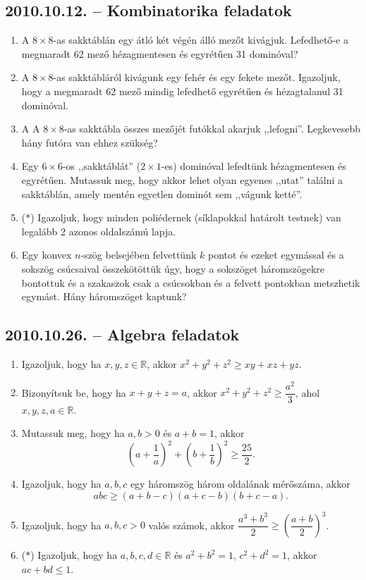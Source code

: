 \documentclass{article}
\begin{document}
\subsection*{2010.10.12. -- Kombinatorika feladatok}
\begin{enumerate}
\item A $8\times 8$-as sakktáblán egy átló két végén álló mezőt kivágjuk. Lefedhető-e a megmaradt 62 mező hézagmentesen és egyrétűen 31 dominóval?
\item A $8\times 8$-as sakktábláról kivágunk egy fehér és egy fekete mezőt. Igazoljuk, hogy a megmaradt 62 mező mindig lefedhető egyrétűen és hézagtalanul 31 dominóval.
\item A A $8\times 8$-as sakktábla összes mezőjét futókkal akarjuk ,,lefogni''.
Legkevesebb hány futóra van ehhez szükség?
\item Egy $6\times 6$-os ,,sakktáblát'' ($2\times 1$-es) dominóval lefedtünk hézagmentesen és egyrétűen. Mutassuk meg, hogy akkor lehet olyan egyenes ,,utat''
találni a sakktáblán, amely mentén egyetlen dominót sem ,,vágunk ketté''.
\item ($*$) Igazoljuk, hogy minden poliédernek (síklapokkal határolt testnek) van legalább 2 azonos oldalszámú lapja.
\item Egy konvex $n$-szög belsejében felvettünk $k$ pontot és ezeket egymással és a sokszög csúcsaival összekötöttük úgy, hogy a sokszöget háromszögekre bontottuk és a szakaszok csak a csúcsokban és a felvett pontokban metszhetik egymást. Hány háromszöget kaptunk?
\end{enumerate}

\subsection*{2010.10.26. -- Algebra feladatok}
\begin{enumerate}
\item Igazoljuk, hogy ha $x,y,z\in\mathbb{R}$, akkor
$x^2+y^2+z^2\ge xy+xz+yz$.
\item Bizonyítsuk be, hogy ha $x+y+z=a$, akkor $x^2+y^2+z^2\ge \dfrac{a^2}{3}$,
ahol $x,y,z,a\in\mathbb{R}$.
\item Mutassuk meg, hogy ha $a,b>0$ és $a+b=1$, akkor
$$\left(a+\dfrac{1}{a}\right)^2+\left(b+\dfrac{1}{b}\right)^2\ge \dfrac{25}{2}.$$
\item Igazoljuk, hogy ha $a,b,c$ egy háromszög három oldalának mérőszáma, akkor 
$$abc\ge (a+b-c)(a+c-b)(b+c-a).$$
\item Igazoljuk, hogy ha $a,b,c>0$ valós számok, akkor $\dfrac{a^3+b^3}{2}\ge 
\left(\dfrac{a+b}{2}\right)^3$.
\item ($*$) Igazoljuk, hogy ha $a,b,c,d\in\mathbb{R}$ és 
$a^2+b^2=1$, $c^2+d^2=1$, akkor $ac+bd\le 1$.
\end{enumerate}
\end{document}
